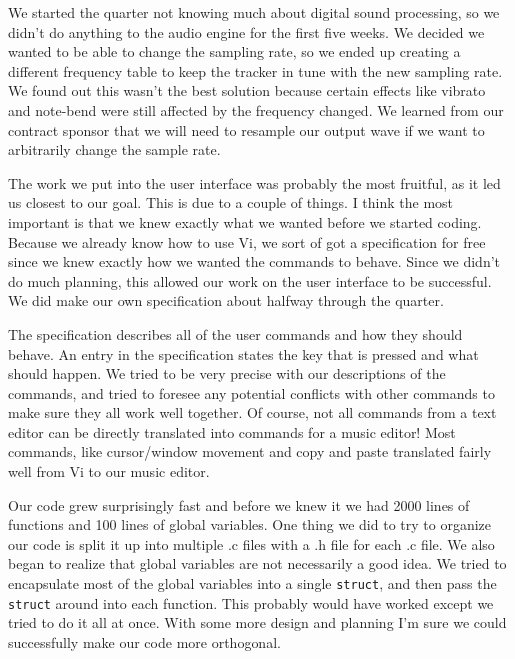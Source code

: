 \documentclass[12pt,letterpaper]{article}
\begin{document}
\par
We started the quarter not knowing much about digital sound processing, so we didn't do anything to the audio engine for the first five weeks. We decided we wanted to be able to change the sampling rate, so we ended up creating a different frequency table to keep the tracker in tune with the new sampling rate. We found out this wasn't the best solution because certain effects like vibrato and note-bend were still affected by the frequency changed. We learned from our contract sponsor that we will need to resample our output wave if we want to arbitrarily change the sample rate.


\par
The work we put into the user interface was probably the most fruitful, as it led us closest to our goal. This is due to a couple of things. I think the most important is that we knew exactly what we wanted before we started coding. Because we already know how to use Vi, we sort of got a specification for free since we knew exactly how we wanted the commands to behave. Since we didn't do much planning, this allowed our work on the user interface to be successful. We did make our own specification about halfway through the quarter.

\par
The specification describes all of the user commands and how they should behave. An entry in the specification states the key that is pressed and what should happen. We tried to be very precise with our descriptions of the commands, and tried to foresee any potential conflicts with other commands to make sure they all work well together. Of course, not all commands from a text editor can be directly translated into commands for a music editor! Most commands, like cursor/window movement and copy and paste translated fairly well from Vi to our music editor.

\par
Our code grew surprisingly fast and before we knew it we had 2000 lines of functions and 100 lines of global variables. One thing we did to try to organize our code is split it up into multiple .c files with a .h file for each .c file. We also began to realize that global variables are not necessarily a good idea. We tried to encapsulate most of the global variables into a single \texttt{struct}, and then pass the \texttt{struct} around into each function. This probably would have worked except we tried to do it all at once. With some more design and planning I'm sure we could successfully make our code more orthogonal.
\end{document}
